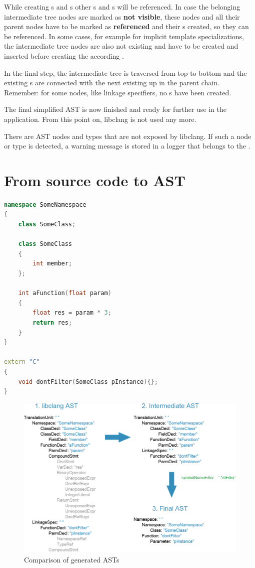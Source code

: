 While creating s and s other s and s will be referenced. In case the belonging intermediate tree nodes are marked as \textbf{not visible}, these nodes and all their parent nodes have to be marked as \textbf{referenced} and their s created, so they can be referenced. In some cases, for example for implicit template specializations, the intermediate tree nodes are also not existing and have to be created and inserted before creating the according .

In the final step, the intermediate tree is traversed from top to bottom and the existing s are connected with the next existing  up in the parent chain. Remember: for some nodes, like linkage specifiers, no s have been created.

The final simplified AST is now finished and ready for further use in the application. From this point on, libclang is not used any more.

There are AST nodes and types that are not exposed by libclang. If such a node or type is detected, a warning message is stored in a logger that belongs to the .

\newpage
\section{From source code to AST}
\SingleSpacing
\begin{lstlisting}[language=C++, caption=Example input code for CPPAnalyzer]
namespace SomeNamespace
{
	class SomeClass;
	
	class SomeClass
	{
		int member;
	};
	
	int aFunction(float param)
	{
		float res = param * 3;
		return res;
	}
}

extern "C"
{
	void dontFilter(SomeClass pInstance){};
}
\end{lstlisting}
\OnehalfSpacing

\begin{figure}[h] %
	\centering
		\includegraphics[scale=0.45]{Images/TreeExample.png}
	\caption{Comparison of generated ASTs}
	\label{fig:TreeExample}
\end{figure}

